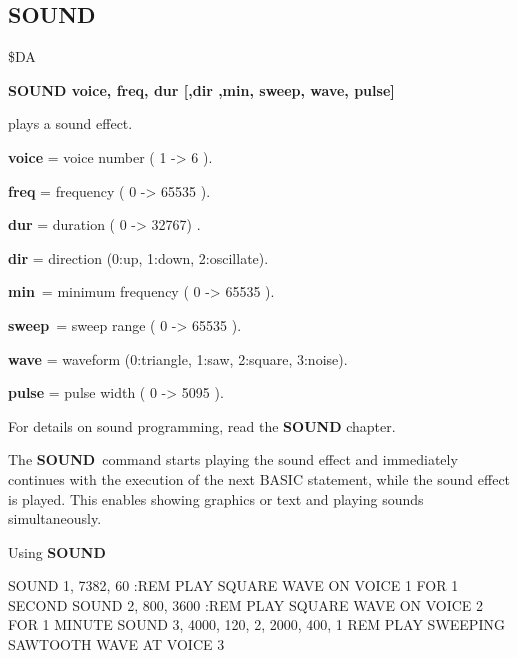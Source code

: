 \subsection{SOUND}
\begin{description}[leftmargin=3cm,style=nextline]
\item [Token:] \$DA
\item [Format:] {\bf SOUND voice, freq, dur
                [,dir ,min, sweep, wave, pulse]}

\item [Usage:] plays a sound effect.

               {\bf voice} = voice number ( 1 -> 6 ).

               {\bf freq} = frequency ( 0 -> 65535 ).

               {\bf dur} = duration ( 0 -> 32767) .

               {\bf dir} = direction (0:up, 1:down, 2:oscillate).

               {\bf min} = minimum frequency ( 0 -> 65535 ).

               {\bf sweep} = sweep range ( 0 -> 65535 ).

               {\bf wave} = waveform (0:triangle, 1:saw, 2:square,
               3:noise).

               {\bf pulse} = pulse width ( 0 -> 5095 ).

For details on sound programming, read the {\bf SOUND} chapter.

\item [Remarks:] The {\bf SOUND} command starts playing the sound
               effect and immediately continues with the execution
               of the next BASIC statement, while the sound effect
               is played. This enables showing graphics or text
               and playing sounds simultaneously.

\item [Example:] Using {\bf SOUND}
\begin{screenoutput}
 SOUND 1, 7382, 60   :REM PLAY SQUARE WAVE ON VOICE 1 FOR 1 SECOND
 SOUND 2,  800, 3600 :REM PLAY SQUARE WAVE ON VOICE 2 FOR 1 MINUTE
 SOUND 3, 4000, 120, 2, 2000, 400, 1
 REM PLAY SWEEPING SAWTOOTH WAVE AT VOICE 3
\end{screenoutput}
\end{description}


\newpage
